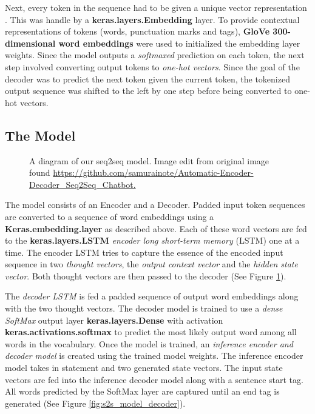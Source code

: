 Next, every token in the sequence had to be given a unique vector representation \cite{DBLP:journals/corr/MikolovSCCD13}. 
This was handle by a \textbf{keras.layers.Embedding} layer. 
To provide contextual representations of tokens (words, punctuation marks and tags), \textbf{GloVe 300-dimensional word embeddings} were used to initialized the embedding layer weights. 
Since the model outputs a \emph{softmaxed} prediction on each token, the next step involved converting output tokens to \emph{one-hot vectors}. 
Since the goal of the decoder was to predict the next token given the current token, the tokenized output sequence was shifted to the left by one step before being converted to one-hot vectors.  
%

\subsection{The Model}
\begin{figure}
	\begin{center}
	\end{center}
	\caption{A diagram of our seq2seq model. Image edit from original image found \url{https://github.com/samurainote/Automatic-Encoder-Decoder_Seq2Seq_Chatbot.}}
	\label{fig:s2s_model}
\end{figure}
The model consists of an Encoder and a Decoder.
Padded input token sequences are converted to a sequence of word embeddings using a \textbf{Keras.embedding.layer} as described above.
Each of these word vectors are fed to the \textbf{keras.layers.LSTM} \emph{encoder long short-term memory} (LSTM) one at a time. 
The encoder LSTM tries to capture the essence of the encoded input sequence in two \emph{thought vectors}, the \emph{output context vector} and the \emph{hidden state vector}.
Both thought vectors are then passed to the decoder (See Figure \ref{fig:s2s_model}).

The \emph{decoder LSTM} is fed a padded sequence of output word embeddings along with the two thought vectors.
The decoder model is trained to use a \emph{dense SoftMax} output layer \textbf{keras.layers.Dense} with activation \textbf{keras.activations.softmax} to predict the most likely output word among all words in the vocabulary.
Once the model is trained, an \emph{inference encoder and decoder model} is created using the trained model weights. 
The inference encoder model takes in statement and two generated state vectors. 
The input state vectors are fed into the inference decoder model along with a sentence start tag. 
All words predicted by the SoftMax layer are captured until an end tag is generated (See Figure \ref{fig:s2s_model_decoder}).

